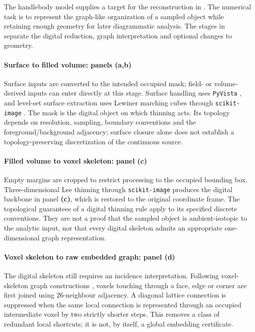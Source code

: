 \documentclass[10pt,twocolumn]{article}
\begin{document}
The handlebody model \cite{kg_ishii2012handlebody} supplies a target for the reconstruction in . The numerical task is to represent the graph-like organization of a sampled object while retaining enough geometry for later diagrammatic analysis. The stages in  separate the digital reduction, graph interpretation and optional changes to geometry.

\paragraph{Surface to filled volume: panels (a,b)}
Surface inputs are converted to the intended occupied mask; field- or volume-derived inputs can enter directly at this stage. Surface handling uses \texttt{PyVista} \cite{kg_sullivan2019pyvista}, and level-set surface extraction uses Lewiner marching cubes through \texttt{scikit-image} \cite{kg_lewiner2003marching,kg_vanderwalt2014skimage}. The mask is the digital object on which thinning acts. Its topology depends on resolution, sampling, boundary conventions and the foreground/background adjacency; surface closure alone does not establish a topology-preserving discretization of the continuous source.

\paragraph{Filled volume to voxel skeleton: panel (c)}
Empty margins are cropped to restrict processing to the occupied bounding box. Three-dimensional Lee thinning through \texttt{scikit-image} \cite{kg_lee1994thinning,kg_vanderwalt2014skimage} produces the digital backbone in panel \textbf{(c)}, which is restored to the original coordinate frame. The topological guarantees of a digital thinning rule apply to its specified discrete conventions. They are not a proof that the sampled object is ambient-isotopic to the analytic input, nor that every digital skeleton admits an appropriate one-dimensional graph representation.

\paragraph{Voxel skeleton to raw embedded graph: panel (d)}
The digital skeleton still requires an incidence interpretation. Following voxel-skeleton graph constructions \cite{kg_reinders2000skeletongraph}, voxels touching through a face, edge or corner are first joined using $26$-neighbour adjacency. A diagonal lattice connection is suppressed when the same local connection is represented through an occupied intermediate voxel by two strictly shorter steps. This removes a class of redundant local shortcuts; it is not, by itself, a global embedding certificate.
\end{document}
